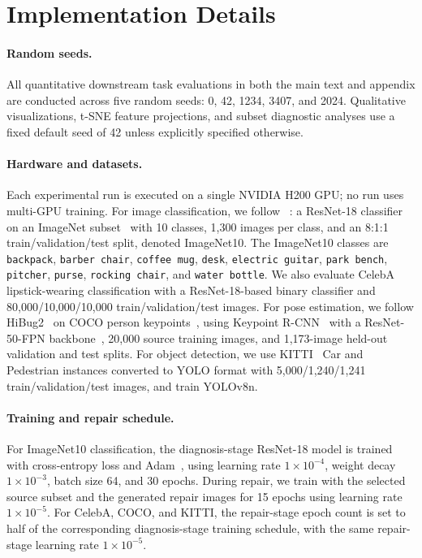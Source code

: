 \section{Implementation Details}
\label{app:implementation-details}

\paragraph{Random seeds.}
All quantitative downstream task evaluations in both the main text and appendix are conducted across five random seeds: 0, 42, 1234, 3407, and 2024. Qualitative visualizations, t-SNE feature projections, and subset diagnostic analyses use a fixed default seed of 42 unless explicitly specified otherwise.

\paragraph{Hardware and datasets.}

Each experimental run is executed on a single NVIDIA H200 GPU; no run uses multi-GPU training. For image classification, we follow \safefix~\citep{xu2025safefix}: a ResNet-18 classifier~\citep{he2016deep} on an ImageNet subset~\citep{deng2009imagenet} with 10 classes, 1,300 images per class, and an 8:1:1 train/validation/test split, denoted ImageNet10. The ImageNet10 classes are \texttt{backpack}, \texttt{barber chair}, \texttt{coffee mug}, \texttt{desk}, \texttt{electric guitar}, \texttt{park bench}, \texttt{pitcher}, \texttt{purse}, \texttt{rocking chair}, and \texttt{water bottle}. We also evaluate CelebA~\citep{liu2015deep} lipstick-wearing classification with a ResNet-18-based binary classifier and 80,000/10,000/10,000 train/validation/test images. For pose estimation, we follow HiBug2~\citep{chen2025hibug2} on COCO person keypoints~\citep{lin2014microsoft}, using Keypoint R-CNN~\citep{mask-rcnn-2017} with a ResNet-50-FPN backbone~\citep{he2016deep}, 20,000 source training images, and 1,173-image held-out validation and test splits. For object detection, we use KITTI~\citep{geiger2012we} Car and Pedestrian instances converted to YOLO format with 5,000/1,240/1,241 train/validation/test images, and train YOLOv8n.
\paragraph{Training and repair schedule.}
For ImageNet10 classification, the diagnosis-stage ResNet-18 model is trained with cross-entropy loss and Adam~\citep{kingma2015adam}, using learning rate $1\times10^{-4}$, weight decay $1\times10^{-3}$, batch size 64, and 30 epochs. During repair, we train with the selected source subset and the generated repair images for 15 epochs using learning rate $1\times10^{-5}$. For CelebA, COCO, and KITTI, the repair-stage epoch count is set to half of the corresponding diagnosis-stage training schedule, with the same repair-stage learning rate $1\times10^{-5}$.

